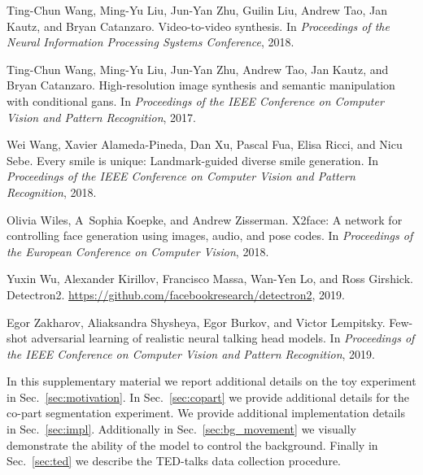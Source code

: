 \documentclass[final]{cvpr}
\begin{document}
\begin{thebibliography}{10}
Ting-Chun Wang, Ming-Yu Liu, Jun-Yan Zhu, Guilin Liu, Andrew Tao, Jan Kautz,
  and Bryan Catanzaro.
\newblock Video-to-video synthesis.
\newblock In {\em Proceedings of the Neural Information Processing Systems
  Conference}, 2018.

Ting-Chun Wang, Ming-Yu Liu, Jun-Yan Zhu, Andrew Tao, Jan Kautz, and Bryan
  Catanzaro.
\newblock High-resolution image synthesis and semantic manipulation with
  conditional gans.
\newblock In {\em Proceedings of the IEEE Conference on Computer Vision and
  Pattern Recognition}, 2017.

Wei Wang, Xavier Alameda-Pineda, Dan Xu, Pascal Fua, Elisa Ricci, and Nicu
  Sebe.
\newblock Every smile is unique: Landmark-guided diverse smile generation.
\newblock In {\em Proceedings of the IEEE Conference on Computer Vision and
  Pattern Recognition}, 2018.

Olivia Wiles, A~Sophia Koepke, and Andrew Zisserman.
\newblock X2face: A network for controlling face generation using images,
  audio, and pose codes.
\newblock In {\em Proceedings of the European Conference on Computer Vision},
  2018.

Yuxin Wu, Alexander Kirillov, Francisco Massa, Wan-Yen Lo, and Ross Girshick.
\newblock Detectron2.
\newblock \url{https://github.com/facebookresearch/detectron2}, 2019.

Egor Zakharov, Aliaksandra Shysheya, Egor Burkov, and Victor Lempitsky.
\newblock Few-shot adversarial learning of realistic neural talking head
  models.
\newblock In {\em Proceedings of the IEEE Conference on Computer Vision and
  Pattern Recognition}, 2019.

\end{thebibliography}

\clearpage

\renewcommand{\thesection}{\Alph{section}}
\setcounter{section}{0}

In this supplementary material we report additional details on the toy experiment in Sec.~\ref{sec:motivation}.  In Sec.~\ref{sec:copart} we provide additional details for the co-part segmentation experiment. We provide additional implementation details in Sec.~\ref{sec:impl}.
Additionally in Sec.~\ref{sec:bg_movement} we visually demonstrate the ability of the model to control the background. Finally in Sec.~\ref{sec:ted} we describe the TED-talks data collection procedure. 
\end{document}
